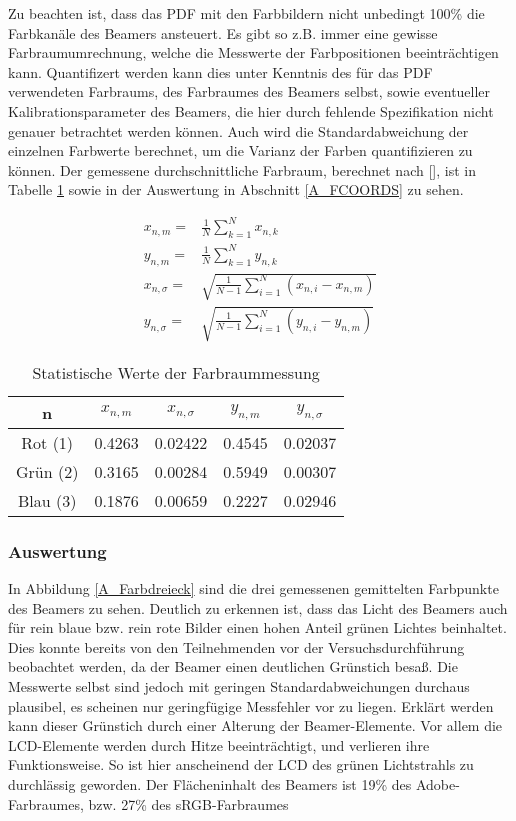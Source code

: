 Zu beachten ist, dass das PDF mit den Farbbildern nicht unbedingt 100\% die Farbkanäle des Beamers ansteuert. Es gibt so z.B. immer eine gewisse Farbraumumrechnung, welche die Messwerte der Farbpositionen beeinträchtigen kann. Quantifizert werden kann dies unter Kenntnis des für das PDF verwendeten Farbraums, des Farbraumes des Beamers selbst, sowie eventueller Kalibrationsparameter des Beamers, die hier durch fehlende Spezifikation nicht genauer betrachtet werden können. Auch wird die Standardabweichung der einzelnen Farbwerte berechnet, um die Varianz der Farben quantifizieren zu können. Der gemessene durchschnittliche Farbraum, berechnet nach [\cite[Seite 27]{AML_SKRIPT}], ist in Tabelle \ref{tab:TV3_Averages} sowie in der Auswertung in Abschnitt \ref{A_FCOORDS} zu sehen.

\begin{eqnarray*}
x_{n,m} = &\frac{1}{N}\sum_{k=1}^{N} x_{n,k} \\
y_{n,m} = &\frac{1}{N}\sum_{k=1}^{N} y_{n,k} \\
x_{n,\sigma} = &\sqrt{\frac{1}{N-1}\sum_{i=1}^{N}\left(x_{n,i}-x_{n,m}\right)}  \\
y_{n,\sigma} = &\sqrt{\frac{1}{N-1}\sum_{i=1}^{N}\left(y_{n,i}-y_{n,m}\right)}
\end{eqnarray*}

\begin{table}[h!]
\centering
\caption{Statistische Werte der Farbraummessung}
\label{tab:TV3_Averages}
\begin{tabular}{| c | c | c | c | c |}
\hline
n & $x_{n,m}$ & $x_{n,\sigma}$ & $y_{n,m}$ & $y_{n,\sigma}$ \\
\hline
Rot (1) & 0.4263 & 0.02422 & 0.4545 & 0.02037 \\
Grün (2) & 0.3165 & 0.00284 & 0.5949 & 0.00307 \\
Blau (3) & 0.1876 & 0.00659 & 0.2227 & 0.02946 \\
\hline
\end{tabular}
\end{table}

\subsubsection{Auswertung}

In Abbildung \ref{A_Farbdreieck} sind die drei gemessenen gemittelten Farbpunkte des Beamers zu sehen. Deutlich zu erkennen ist, dass das Licht des Beamers auch für rein blaue bzw. rein rote Bilder einen hohen Anteil grünen Lichtes beinhaltet. Dies konnte bereits von den Teilnehmenden vor der Versuchsdurchführung beobachtet werden, da der Beamer einen deutlichen Grünstich besaß. Die Messwerte selbst sind jedoch mit geringen Standardabweichungen durchaus plausibel, es scheinen nur geringfügige Messfehler vor zu liegen. Erklärt werden kann dieser Grünstich durch einer Alterung der Beamer-Elemente. Vor allem die LCD-Elemente werden durch Hitze beeinträchtigt, und verlieren ihre Funktionsweise. So ist hier anscheinend der LCD des grünen Lichtstrahls zu durchlässig geworden. 
Der Flächeninhalt des Beamers ist 19\% des Adobe-Farbraumes, bzw. 27\% des sRGB-Farbraumes